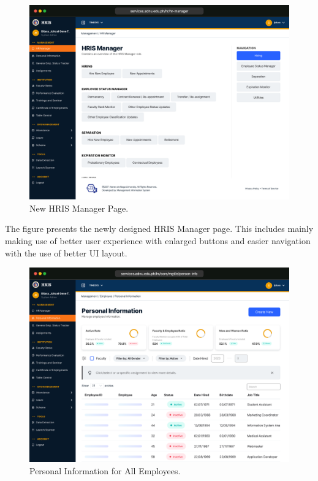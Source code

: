     \begin{figure}[H]
        \centering
        \includegraphics[width=1\linewidth]{figures/app/dashboard.png}
        \caption{New HRIS Manager Page.}
        \label{fig:app-manager}
    \end{figure}

    The figure presents the newly designed HRIS Manager page. This includes mainly making use of better user experience with enlarged buttons and easier navigation with the use of better UI layout.

    \begin{figure}[H]
        \centering
        \includegraphics[width=1\linewidth]{figures/app/pi.png}
        \caption{Personal Information for All Employees.}
        \label{fig:app-pi}
    \end{figure}

